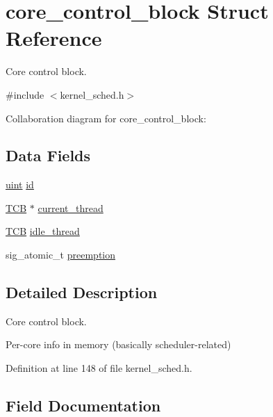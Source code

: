 \hypertarget{structcore__control__block}{}\section{core\+\_\+control\+\_\+block Struct Reference}
\label{structcore__control__block}


Core control block.  




{\ttfamily \#include $<$kernel\+\_\+sched.\+h$>$}



Collaboration diagram for core\+\_\+control\+\_\+block\+:
\subsection*{Data Fields}
\begin{DoxyCompactItemize}
\item 
\hyperlink{bios_8h_a91ad9478d81a7aaf2593e8d9c3d06a14}{uint} \hyperlink{structcore__control__block_a5208867f309bdd1656fd473f38b30bfe}{id}
\item 
\hyperlink{structthread__control__block}{T\+CB} $\ast$ \hyperlink{structcore__control__block_aac649db5b9a99e693ed21c7e610834bf}{current\+\_\+thread}
\item 
\hyperlink{structthread__control__block}{T\+CB} \hyperlink{structcore__control__block_a6dd29dab4a95ce740f45370345408c52}{idle\+\_\+thread}
\item 
sig\+\_\+atomic\+\_\+t \hyperlink{structcore__control__block_a858cde45d4478d73f60e839594b363f4}{preemption}
\end{DoxyCompactItemize}


\subsection{Detailed Description}
Core control block. 

Per-\/core info in memory (basically scheduler-\/related) 

Definition at line 148 of file kernel\+\_\+sched.\+h.



\subsection{Field Documentation}
\mbox{\label{structcore__control__block_aac649db5b9a99e693ed21c7e610834bf}} 
